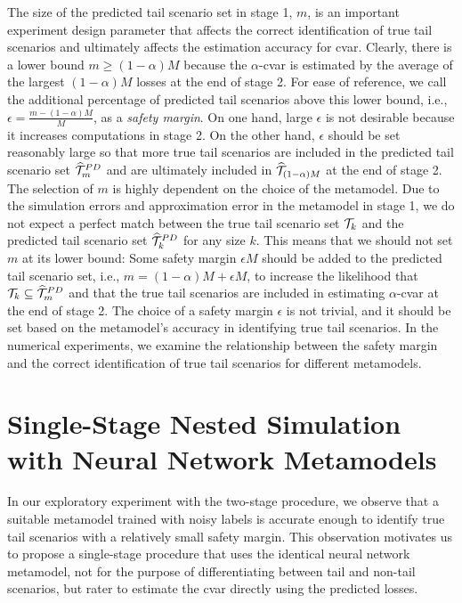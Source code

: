 The size of the predicted tail scenario set in stage 1, $m$, is an important experiment design parameter that affects the correct identification of true tail scenarios and ultimately affects the estimation accuracy for \gls{cvar}.
Clearly, there is a lower bound $m \geq (1-\alpha)M$ because the $\alpha$-\gls{cvar} is estimated by the average of the largest $(1-\alpha)M$ losses at the end of stage 2.
For ease of reference, we call the additional percentage of predicted tail scenarios above this lower bound, i.e., $\epsilon = \frac{m - (1-\alpha)M}{M}$, as a \textit{safety margin}.
On one hand, large $\epsilon$ is not desirable because it increases computations in stage 2.
On the other hand, $\epsilon$ should be set reasonably large so that more true tail scenarios are included in the predicted tail scenario set $\widehat{\mathcal{T}}_{m}^{PD}$ and are ultimately included in $\widehat{\mathcal{T}}_{(1-\alpha )M}$ at the end of stage 2.
The selection of $m$ is highly dependent on the choice of the metamodel.
Due to the simulation errors and approximation error in the metamodel in stage 1, we do not expect a perfect match between the true tail scenario set $\mathcal{T}_{k}$ and the predicted tail scenario set $\widehat{\mathcal{T}}_{k}^{PD}$ for any size $k$.
This means that we should not set $m$ at its lower bound: Some safety margin $\epsilon M$ should be added to the predicted tail scenario set, i.e., $m = (1-\alpha )M + \epsilon M$, to increase the likelihood that $\mathcal{T}_{k} \subseteq \widehat{\mathcal{T}}_{m}^{PD}$ and that the true tail scenarios are included in estimating $\alpha$-\gls{cvar} at the end of stage 2.
The choice of a safety margin $\epsilon$ is not trivial, and it should be set based on the metamodel's accuracy in identifying true tail scenarios.
In the numerical experiments, we examine the relationship between the safety margin and the correct identification of true tail scenarios for different metamodels.

\section{Single-Stage Nested Simulation with Neural Network Metamodels} \label{sec2:metamodel1Stage}

In our exploratory experiment with the two-stage procedure, we observe that a suitable metamodel trained with noisy labels is accurate enough to identify true tail scenarios with a relatively small safety margin.
This observation motivates us to propose a single-stage procedure that uses the identical neural network metamodel, not for the purpose of differentiating between tail and non-tail scenarios, but rater to estimate the \gls{cvar} directly using the predicted losses. 

